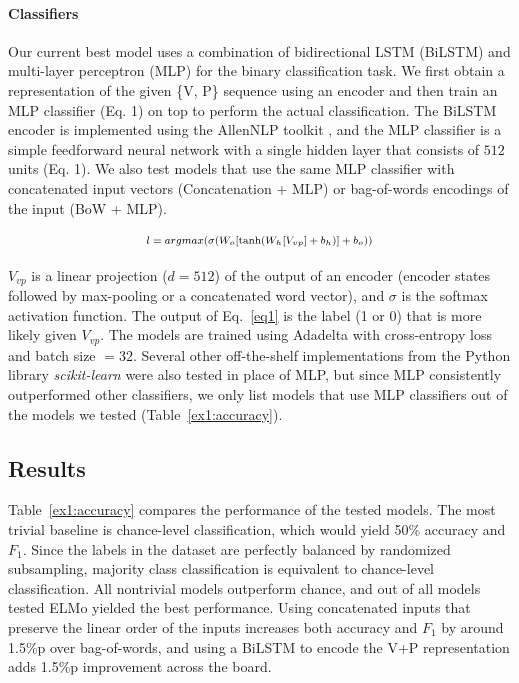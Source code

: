 \documentclass[letterpaper]{article} %
\begin{document}
\paragraph{Classifiers}
Our current best model uses a combination of bidirectional LSTM (BiLSTM) and multi-layer perceptron (MLP) for the binary classification task. We first obtain a representation of the given \{\textsc{V, P}\} sequence using an encoder and then train an MLP classifier (Eq. 1) on top to perform the actual classification. The BiLSTM encoder is implemented using the AllenNLP toolkit \cite{gardner2018allennlp}, and the MLP classifier is a simple feedforward neural network with a single hidden layer that consists of $512$ units (Eq. 1). We also test models that use the same MLP classifier with concatenated input vectors (Concatenation + MLP) or bag-of-words encodings of the input (BoW + MLP).


\begin{equation}
\label{eq1}
\fontsize{7.5pt}{8.5pt}\selectfont
\begin{array}{ll}
l = argmax(\sigma(W_o [ \tanh(W_h[V_{vp}] + b_h)] + b_o))
\end{array}
\end{equation}

\noindent $V_{vp}$ is a linear projection ($d=512$) of the output of an encoder (encoder states followed by max-pooling or a concatenated word vector), and $\sigma$ is the softmax activation function. The output of Eq.~\ref{eq1} is the label (1 or 0) that is more likely given $V_{vp}$. The models are trained using Adadelta \cite{zeiler2012adadelta} with cross-entropy loss and batch size $=32$. Several other off-the-shelf implementations from the Python library \textit{scikit-learn} were also tested in place of MLP, but since MLP consistently outperformed other classifiers, we only list models that use MLP classifiers out of the models we tested (Table~\ref{ex1:accuracy}).

\subsection{Results}
Table~\ref{ex1:accuracy} compares the performance of the tested models. The most trivial baseline is chance-level classification, which would yield 50\% accuracy and $F_1$. Since the labels in the dataset are perfectly balanced by randomized subsampling, majority class classification is equivalent to chance-level classification. All nontrivial models outperform chance, and out of all models tested ELMo yielded the best performance. Using concatenated inputs that preserve the linear order of the inputs increases both accuracy and $F_1$ by around 1.5\%p over bag-of-words, and using a BiLSTM to encode the V+P representation adds 1.5\%p improvement across the board.
\end{document}
